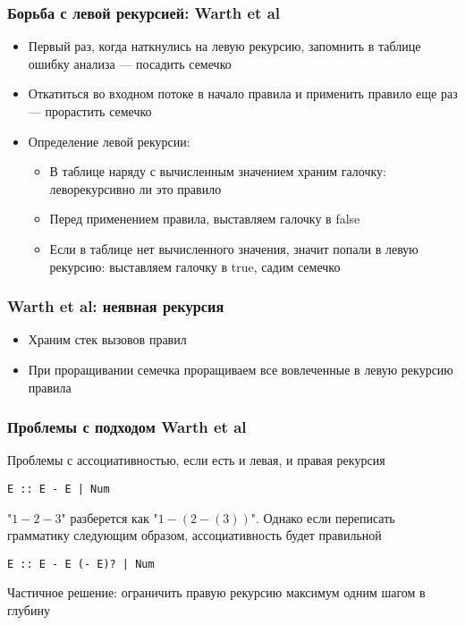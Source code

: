 \documentclass{beamer}
\begin{document}
\begin{frame}[fragile]
  \transwipe[direction=90]
  \frametitle{Борьба с левой рекурсией: Warth et al}
\begin{itemize}
  \item Первый раз, когда наткнулись на левую рекурсию, запомнить в таблице 
ошибку анализа --- посадить семечко
  \item Откатиться во входном потоке в начало правила и применить правило еще раз --- прорастить семечко
\end{itemize}

\begin{itemize}
  \item Определение левой рекурсии:
  \begin{itemize}
    \item В таблице наряду с вычисленным значением храним галочку: 
леворекурсивно ли это правило
    \item Перед применением правила, выставляем галочку в false
    \item Если в таблице нет вычисленного значения, значит попали в левую 
рекурсию: выставляем галочку в true, садим семечко
  \end{itemize}
\end{itemize}
\end{frame}

\begin{frame}[fragile]
  \transwipe[direction=90]
  \frametitle{Warth et al: неявная рекурсия}
\begin{itemize}
  \item Храним стек вызовов правил
  \item При проращивании семечка проращиваем все вовлеченные в левую рекурсию 
правила
\end{itemize}
\end{frame}


\begin{frame}[fragile]
  \transwipe[direction=90]
  \frametitle{Проблемы с подходом Warth et al}
Проблемы с ассоциативностью, если есть и левая, и правая рекурсия

\begin{verbatim}
E :: E - E | Num
\end{verbatim}

"$1-2-3$" разберется как "$1-(2-(3))$". Однако если переписать грамматику 
следующим образом, ассоциативность будет правильной

\begin{verbatim}
E :: E - E (- E)? | Num
\end{verbatim}

Частичное решение: ограничить правую рекурсию максимум одним шагом в глубину

\end{frame}
\end{document}
